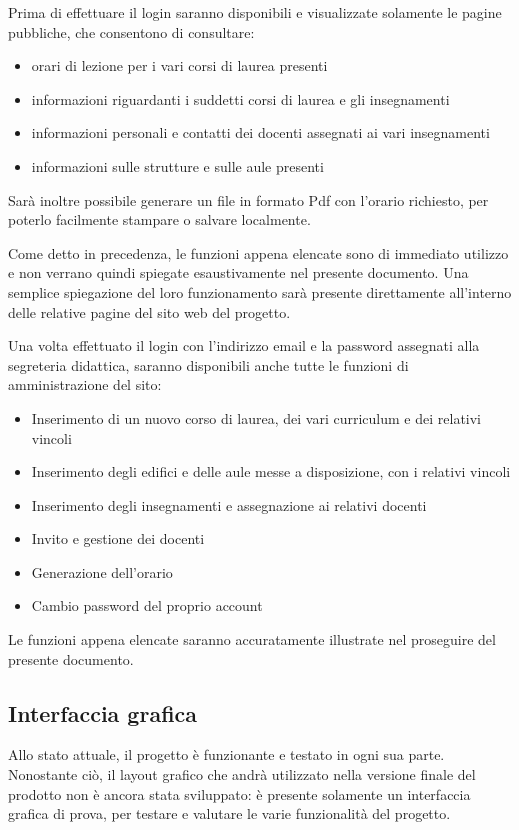\documentclass[11pt,a4paper]{article}
\begin{document}
Prima di effettuare il login saranno disponibili e visualizzate solamente le pagine pubbliche, che consentono di consultare:
\begin{itemize}
 \item orari di lezione per i vari corsi di laurea presenti
 \item informazioni riguardanti i suddetti corsi di laurea e gli insegnamenti
 \item informazioni personali e contatti dei docenti assegnati ai vari insegnamenti
 \item informazioni sulle strutture e sulle aule presenti
\end{itemize}
Sarà inoltre possibile generare un file in formato Pdf con l'orario richiesto, per poterlo facilmente stampare o salvare localmente.

Come detto in precedenza, le funzioni appena elencate sono di immediato utilizzo e non verrano quindi spiegate esaustivamente nel presente documento.
Una semplice spiegazione del loro funzionamento sarà presente direttamente all'interno delle relative pagine del sito web del progetto.

\bigskip
Una volta effettuato il login con l'indirizzo email e la password assegnati alla segreteria didattica, saranno disponibili anche tutte le funzioni di amministrazione del sito:
\begin{itemize}
 \item Inserimento di un nuovo corso di laurea, dei vari curriculum e dei relativi vincoli
 \item Inserimento degli edifici e delle aule messe a disposizione, con i relativi vincoli
 \item Inserimento degli insegnamenti e assegnazione ai relativi docenti
 \item Invito e gestione dei docenti
 \item Generazione dell'orario
 \item Cambio password del proprio account
\end{itemize}
Le funzioni appena elencate saranno accuratamente illustrate nel proseguire del presente documento.
\subsection{Interfaccia grafica}
Allo stato attuale, il progetto è funzionante e testato in ogni sua parte.
Nonostante ciò, il layout grafico che andrà utilizzato nella versione finale del prodotto non è ancora stata sviluppato: è presente solamente un interfaccia grafica di prova, per testare e valutare le varie funzionalità del progetto.
\end{document}

